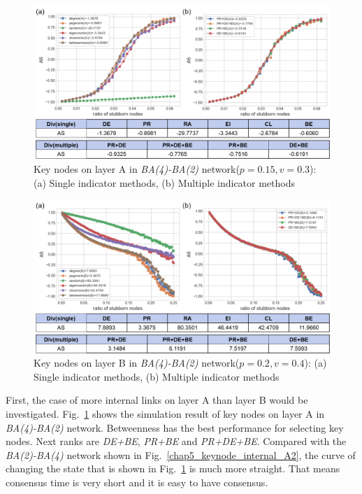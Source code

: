 \begin{figure}[!htb]
	\centering
	\includegraphics[width=\hsize]{figure/chap5_keynode_internal_A.png}
	\caption{Key nodes on layer A in \textit{BA(4)-BA(2)} network($p=0.15, v=0.3$):
		(a) Single indicator methods, (b) Multiple indicator methods}
	\label{chap5_keynode_internal_A}
\end{figure}
\begin{figure}[!htb]
	\centering
	\includegraphics[width=\hsize]{figure/chap5_keynode_internal_B.png}
	\caption{Key nodes on layer B in \textit{BA(4)-BA(2)} network($p=0.2, v=0.4$):
		(a) Single indicator methods, (b) Multiple indicator methods}
	\label{chap5_keynode_internal_B}
\end{figure}

First, the case of more internal links on layer A than layer B would be investigated. 
Fig.~\ref{chap5_keynode_internal_A} shows the simulation result of key nodes on layer A in \textit{BA(4)-BA(2)} network. Betweenness has the best performance for selecting key nodes. Next ranks are \textit{DE+BE}, \textit{PR+BE} and \textit{PR+DE+BE}. Compared with the \textit{BA(2)-BA(4)} network shown in Fig.~\ref{chap5_keynode_internal_A2}, the curve of changing the state that is shown in Fig.~\ref{chap5_keynode_internal_A} is much more straight. That means consensus time is very short and it is easy to have consensus.

